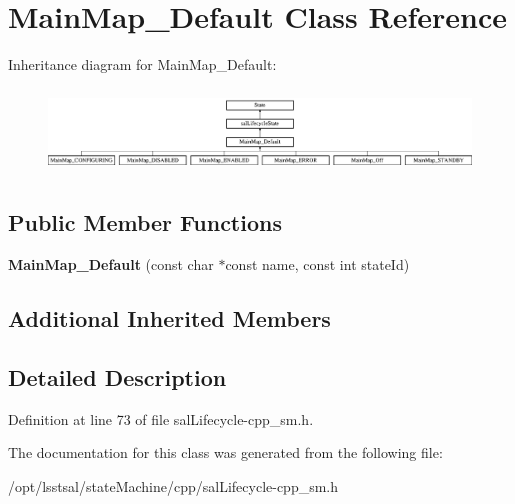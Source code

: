 \hypertarget{class_main_map___default}{\section{Main\-Map\-\_\-\-Default Class Reference}
\label{class_main_map___default}
}
Inheritance diagram for Main\-Map\-\_\-\-Default\-:\begin{figure}[H]
\begin{center}
\leavevmode
\includegraphics[height=2.262626cm]{class_main_map___default}
\end{center}
\end{figure}
\subsection*{Public Member Functions}
\begin{DoxyCompactItemize}
\item 
\hypertarget{class_main_map___default_a61e352bbc45058065a51410e7c9f5f1f}{{\bfseries Main\-Map\-\_\-\-Default} (const char $\ast$const name, const int state\-Id)}\label{class_main_map___default_a61e352bbc45058065a51410e7c9f5f1f}

\end{DoxyCompactItemize}
\subsection*{Additional Inherited Members}


\subsection{Detailed Description}


Definition at line 73 of file sal\-Lifecycle-\/cpp\-\_\-sm.\-h.



The documentation for this class was generated from the following file\-:\begin{DoxyCompactItemize}
\item 
/opt/lsstsal/state\-Machine/cpp/sal\-Lifecycle-\/cpp\-\_\-sm.\-h\end{DoxyCompactItemize}

